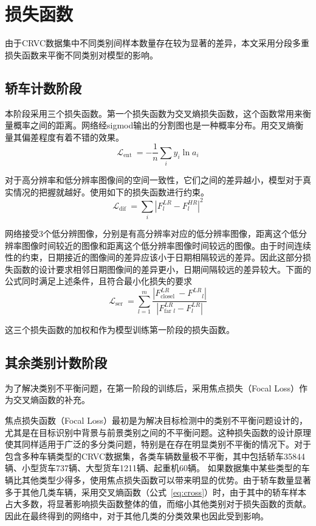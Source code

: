 \section{损失函数}
由于CRVC数据集中不同类别间样本数量存在较为显著的差异，本文采用分段多重损失函数来平衡不同类别对模型的影响。
\subsection{轿车计数阶段}
本阶段采用三个损失函数。第一个损失函数为交叉熵损失函数，这个函数常用来衡量概率之间的距离。网络经sigmod输出的分割图也是一种概率分布。用交叉熵衡量其偏差程度有着不错的效果。
\begin{equation}
    \mathcal{L}_{\text {ent }}=-\frac{1}{n} \sum_{i} y_{i} \ln a_{i}
    \label{eq:cross}
\end{equation}

对于高分辨率和低分辨率图像间的空间一致性，它们之间的差异越小，模型对于真实情况的把握就越好。使用如下的损失函数进行约束。
\begin{equation}
    \mathcal{L}_{\text {dif }}=\sum_{i}\left|F_l^{L R}-F^{HR}_{l}\right|^2
\end{equation}

网络接受3个低分辨图像，分别是有高分辨率对应的低分辨率图像，距离这个低分辨率图像时间较近的图像和距离这个低分辨率图像时间较远的图像。由于时间连续性的约束，日期接近的图像间的差异应该小于日期相隔较远的差异。因此这部分损失函数的设计要求相邻日期图像间的差异更小，日期间隔较远的差异较大。下面的公式同时满足上述条件，且符合最小化损失的要求
\begin{equation}
    \mathcal{L}_{\text {ser }}=\sum_{l=1}^{m} \frac{\left|F_{\text {closel }}^{L R}-F^{L R}{ }_{l}\right|}{\left|F_{\text {far } l}^{L R}-F^{L R}_ l\right|}
\end{equation}

这三个损失函数的加权和作为模型训练第一阶段的损失函数。


\subsection{其余类别计数阶段}
为了解决类别不平衡问题，在第一阶段的训练后，采用焦点损失（Focal Loss）作为交叉熵函数的补充。

焦点损失函数（Focal Loss）\cite{lin2017focal}最初是为解决目标检测中的类别不平衡问题设计的，尤其是在目标识别中背景与前景类别之间的不平衡问题。这种损失函数的设计原理使其同样适用于广泛的多分类问题，特别是在存在明显类别不平衡的情况下。对于包含多种车辆类型的CRVC数据集，各类车辆数量极不平衡，其中包括轿车35844辆、小型货车737辆、大型货车1211辆、起重机60辆。 如果数据集中某些类型的车辆比其他类型少得多，使用焦点损失函数可以带来明显的优势。由于轿车数量显著多于其他几类车辆，采用交叉熵函数（公式~\ref{eq:cross}）时，由于其中的轿车样本占大多数，将显著影响损失函数整体的值，而缩小其他类别对于损失函数的贡献。因此在最终得到的网络中，对于其他几类的分类效果也因此受到影响。


